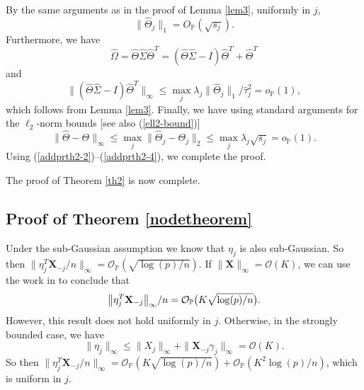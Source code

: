 \documentclass[aos,MSNbibl,dvips]{arximspdf}
\newcommand{\PP}{\mathbb{P}}
\newcommand{\bx}{\mathbf{X}}
\begin{document}

\begin{pf}
By the same arguments as in the proof of Lemma \ref{lem3}, uniformly
in $j$,
%
\[
\| \hat\Theta_j \|_1 = O_{\PP} (
\sqrt{s_j}).
\]
%
Furthermore, we have
%
\begin{equation}
\label{addprth2-2} \hat\Omega= \hat{\Theta} \hat{\Sigma} \hat{\Theta}^T =
(\hat {\Theta} \hat{\Sigma} - I) \hat{\Theta}^T + \hat{
\Theta}^T
\end{equation}
%
and
%
\begin{equation}
\label{addprth2-3}  \bigl\|(\hat{\Theta} \hat{\Sigma} - I) \hat{\Theta
}^T\bigr\| _{\infty} \le \max_j
\lambda_j \|\hat{\Theta}_j\|_1 / \hat
\tau_j^2 = o_{\PP}(1),
\end{equation}
%
which follows from Lemma \ref{lem3}.
Finally, we have using standard arguments for the $\ell_2$-norm bounds [see
also (\ref{ell2-bound})]
%
\begin{equation}
\label{addprth2-4} \|\hat{\Theta} - \Theta\|_{\infty} \le\max
_j \|\hat{\Theta}_j - \Theta_j
\|_2 \le\max_j \lambda_j
\sqrt{s_j} = o_{\PP}(1).
\end{equation}
%
Using (\ref{addprth2-2})--(\ref{addprth2-4}), we complete the
proof.
\end{pf}



The proof of Theorem \ref{th2} is now complete. %

\subsection{Proof of Theorem \protect\ref{nodetheorem}}\label
{subsecprthenode}

Under the sub-Gaussian assumption
we know that $\eta_j$ is also sub-Gaussian. So then $\| \eta_j^T \bx
_{-j} /n \|_{\infty}=
{\mathcal O}_{\PP} ( \sqrt{\log(p)/ n } )$. If $\| \bx\|_{\infty} =
{\mathcal O} (K) $, we can use the work in \cite{Duembgen09}
to conclude that
%
\[
\bigl\| \eta_j^T \bx_{-j} \bigr\|_{\infty}/n = {
\mathcal O }_{\PP} \bigl(K \sqrt {\log (p)/ n } \bigr).\vadjust{\goodbreak} %
\]
%
However, this result does not hold uniformly in $j$.
Otherwise, in the strongly bounded case, we have
%
\[
\| \eta_j \|_{\infty} \le\| X_j
\|_{\infty} + \| \bx_{-j} \gamma _j \|
_{\infty} ={ \mathcal O} (K). %
\]
%
So then $\| \eta_j^T \bx_{-j} /n\|_{\infty} = { \mathcal O }_{\PP} (K
\sqrt{\log(p)/ n } ) + {\mathcal O}_{\PP} ( K^2 \log(p)/ n ) $,
which is uniform in $j$.
\end{document}
